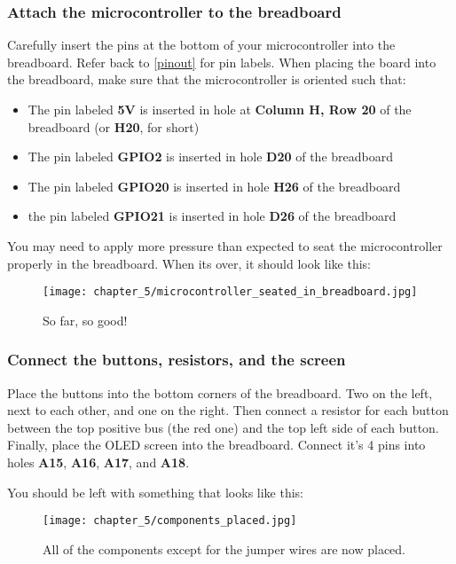 \subsubsection{Attach the microcontroller to the breadboard}
Carefully insert the pins at the bottom of your microcontroller into the breadboard. Refer back to \ref{pinout} for pin labels.
When placing the board into the breadboard, make sure that the microcontroller is oriented such that:
\begin{itemize}
    \item The pin labeled \textbf{5V} is inserted in hole at \textbf{Column H, Row 20} of the breadboard (or \textbf{H20}, for short)
    \item The pin labeled \textbf{GPIO2} is inserted in hole \textbf{D20} of the breadboard
    \item The pin labeled \textbf{GPIO20} is inserted in hole \textbf{H26} of the breadboard
    \item the pin labeled \textbf{GPIO21} is inserted in hole \textbf{D26} of the breadboard
\end{itemize}
You may need to apply more pressure than expected to seat the microcontroller properly in the breadboard. When its over, it should look like this:
\begin{figure}[H]
    \centering
    \texttt{[image: chapter\_5/microcontroller\_seated\_in\_breadboard.jpg]}
    \caption{So far, so good!}
\end{figure}

\subsubsection{Connect the buttons, resistors, and the screen}
Place the buttons into the bottom corners of the breadboard. Two on the left, next to each other, and one on the right.
Then connect a resistor for each button between the top positive bus (the red one) and the top left side of each button.
Finally, place the OLED screen into the breadboard. Connect it's 4 pins into holes \textbf{A15}, \textbf{A16}, \textbf{A17}, and \textbf{A18}.

You should be left with something that looks like this:
\begin{figure}[H]
    \centering
    \texttt{[image: chapter\_5/components\_placed.jpg]}
    \caption{All of the components except for the jumper wires are now placed.}
\end{figure}

